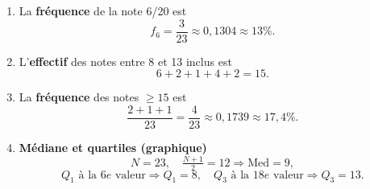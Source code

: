 \documentclass{article}
\theoremstyle{definition}
\begin{document}
\begin{enumerate}
  \item La \textbf{fréquence} de la note 6/20 est 
    \[
      f_6 = \frac{3}{23}\approx 0{,}1304 \approx 13\%.
    \]
    
  \item L’\textbf{effectif} des notes entre 8 et 13 inclus est
    \[
      6 + 2 + 1 + 4 + 2 = 15.
    \]

  \item La \textbf{fréquence} des notes $\ge15$ est
    \[
      \frac{2+1+1}{23} = \frac{4}{23}\approx 0{,}1739 \approx 17{,}4\%.
    \]

  \item \textbf{Médiane et quartiles (graphique)}  
    \[
      N=23,\quad \tfrac{N+1}{2}=12\Longrightarrow \mathrm{Med}=9,
    \]
    \[
      Q_1 \text{ à la } 6\!e\text{ valeur}\Longrightarrow Q_1=8,
    \quad
      Q_3 \text{ à la } 18\!e\text{ valeur}\Longrightarrow Q_3=13.
    \]
\end{enumerate}
\end{document}
